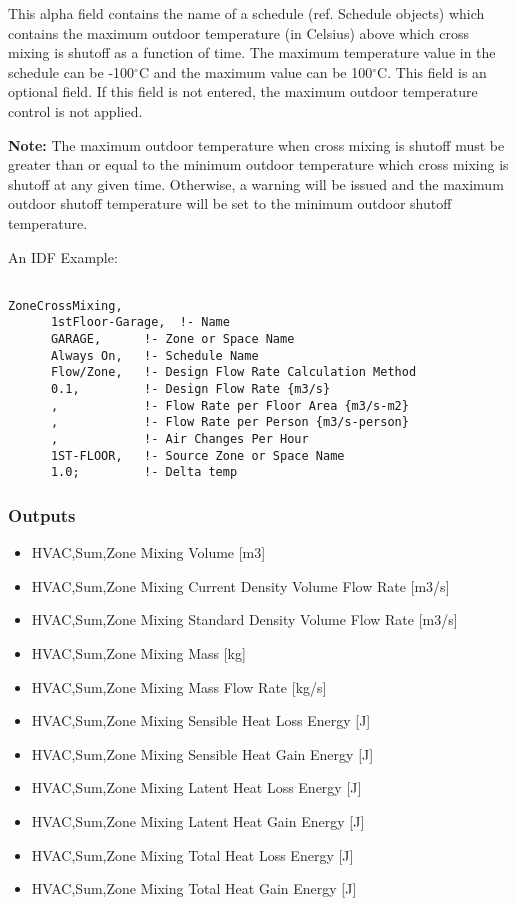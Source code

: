 This alpha field contains the name of a schedule (ref. Schedule objects) which contains the maximum outdoor temperature (in Celsius) above which cross mixing is shutoff as a function of time. The maximum temperature value in the schedule can be -100$^\circ$C and the maximum value can be 100$^\circ$C. This field is an optional field. If this field is not entered, the maximum outdoor temperature control is not applied.

\textbf{Note:} The maximum outdoor temperature when cross mixing is shutoff must be greater than or equal to the minimum outdoor temperature which cross mixing is shutoff at any given time. Otherwise, a warning will be issued and the maximum outdoor shutoff temperature will be set to the minimum outdoor shutoff temperature.

An IDF Example:

\begin{lstlisting}

ZoneCrossMixing,
      1stFloor-Garage,  !- Name
      GARAGE,      !- Zone or Space Name
      Always On,   !- Schedule Name
      Flow/Zone,   !- Design Flow Rate Calculation Method
      0.1,         !- Design Flow Rate {m3/s}
      ,            !- Flow Rate per Floor Area {m3/s-m2}
      ,            !- Flow Rate per Person {m3/s-person}
      ,            !- Air Changes Per Hour
      1ST-FLOOR,   !- Source Zone or Space Name
      1.0;         !- Delta temp
\end{lstlisting}

\subsubsection{Outputs}\label{outputs-4-000}

\begin{itemize}
\item
  HVAC,Sum,Zone Mixing Volume {[}m3{]}
\item
  HVAC,Sum,Zone Mixing Current Density Volume Flow Rate {[}m3/s{]}
\item
  HVAC,Sum,Zone Mixing Standard Density Volume Flow Rate {[}m3/s{]}
\item
  HVAC,Sum,Zone Mixing Mass {[}kg{]}
\item
  HVAC,Sum,Zone Mixing Mass Flow Rate {[}kg/s{]}
\item
  HVAC,Sum,Zone Mixing Sensible Heat Loss Energy {[}J{]}
\item
  HVAC,Sum,Zone Mixing Sensible Heat Gain Energy {[}J{]}
\item
  HVAC,Sum,Zone Mixing Latent Heat Loss Energy {[}J{]}
\item
  HVAC,Sum,Zone Mixing Latent Heat Gain Energy {[}J{]}
\item
  HVAC,Sum,Zone Mixing Total Heat Loss Energy {[}J{]}
\item
  HVAC,Sum,Zone Mixing Total Heat Gain Energy {[}J{]}
\end{itemize}

